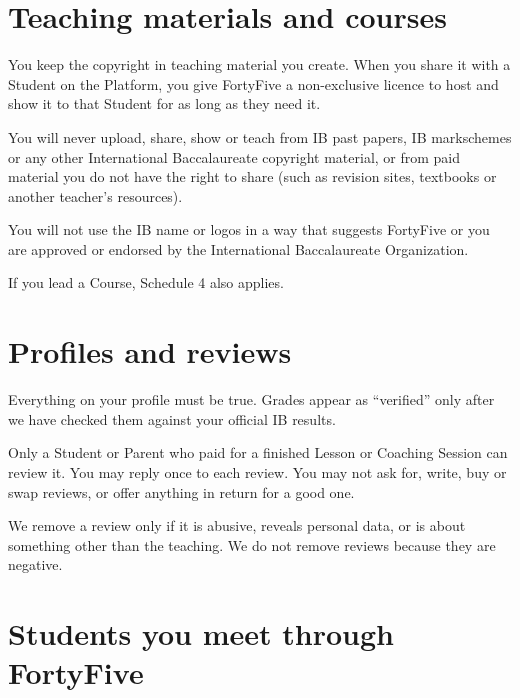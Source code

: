 \documentclass[11pt]{article}
\begin{document}
\section{Teaching materials and courses}

\begin{clauses}
  \item You keep the copyright in teaching material you create. When you share it with a Student on the Platform, you give FortyFive a non-exclusive licence to host and show it to that Student for as long as they need it.
  \item You will never upload, share, show or teach from IB past papers, IB markschemes or any other International Baccalaureate copyright material, or from paid material you do not have the right to share (such as revision sites, textbooks or another teacher's resources).
  \item You will not use the IB name or logos in a way that suggests FortyFive or you are approved or endorsed by the International Baccalaureate Organization.
  \item If you lead a Course, Schedule 4 also applies.
\end{clauses}

\section{Profiles and reviews}

\begin{clauses}
  \item Everything on your profile must be true. Grades appear as ``verified'' only after we have checked them against your official IB results.
  \item Only a Student or Parent who paid for a finished Lesson or Coaching Session can review it. You may reply once to each review. You may not ask for, write, buy or swap reviews, or offer anything in return for a good one.
  \item We remove a review only if it is abusive, reveals personal data, or is about something other than the teaching. We do not remove reviews because they are negative.
\end{clauses}

\section{Students you meet through FortyFive}
\end{document}
